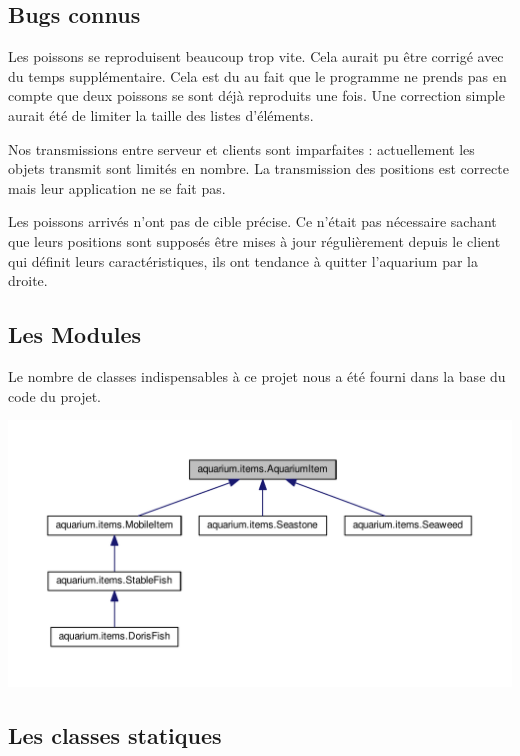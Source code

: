 \documentclass[a4paper, 12pt]{report}
\begin{document}
\begin{spacing}{1.3}
\textcolor{colortitre2}{\subsection*{Bugs connus}}

Les poissons se reproduisent beaucoup trop vite. Cela aurait pu être corrigé avec du temps supplémentaire. Cela est du au fait que le programme ne prends pas en compte que deux poissons se sont déjà reproduits une fois. Une correction simple aurait été de limiter la taille des listes d'éléments.
	
Nos transmissions entre serveur et clients sont imparfaites : actuellement les objets transmit sont limités en nombre. La transmission des positions est correcte mais leur application ne se fait pas.
	
Les poissons arrivés n'ont pas de cible précise. Ce n'était pas nécessaire sachant que leurs positions sont supposés être mises à jour régulièrement depuis le client qui définit leurs caractéristiques, ils ont tendance à quitter l'aquarium par la droite.
	
	
\textcolor{colortitre1}{\subsection*{Les Modules}}

Le nombre de classes indispensables à ce projet nous a été fourni dans la base du code du projet.

\includegraphics[scale=1]{graphique.pdf}

\newpage

\textcolor{colortitre2}{\section*{Les classes statiques}}
	

\end{spacing}
\end{document}
